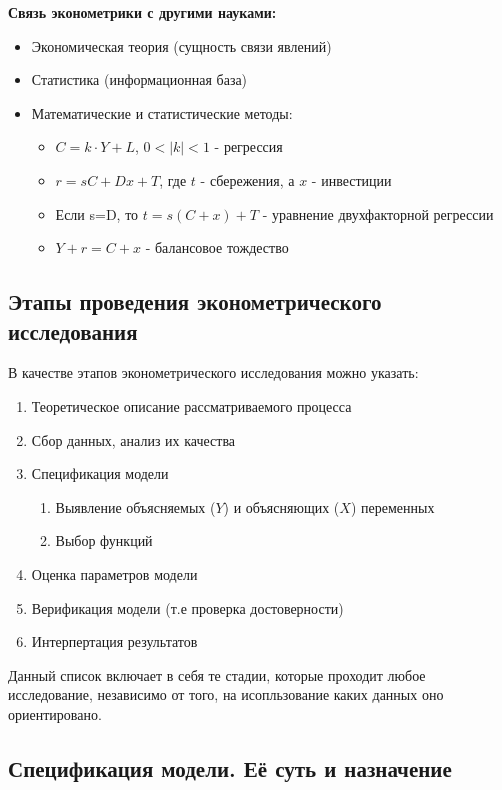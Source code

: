 \documentclass[aps,%
12pt,%
final,%
oneside,
onecolumn,%
musixtex, %
superscriptaddress,%
centertags]{article} %
\theoremstyle{plain}
\theoremstyle{definition}
\theoremstyle{remark}
\begin{document}
\textbf{Связь эконометрики с другими науками:}

\begin{itemize} 
  \item Экономическая теория (сущность связи явлений)
  \item Статистика (информационная база)
  \item Математические и статистические методы:
  \begin{itemize} 
  	\item $C=k\cdot Y+L$, $0<|k|<1$ - регрессия
  	\item $r=sC+Dx+T$, где $t$ - сбережения, а $x$ - инвестиции
  	\item Если s=D, то $t=s(C+x)+T$  - уравнение двухфакторной регрессии
  	\item $Y+r=C+x$ - балансовое тождество 
  \end{itemize} 
\end{itemize}
\newpage
\subsection{Этапы проведения эконометрического исследования }

В качестве этапов эконометрического исследования можно указать:
\begin{enumerate}
	\item Теоретическое описание рассматриваемого процесса
	\item Сбор данных, анализ их качества
	\item Спецификация модели
	\begin{enumerate}
		\item Выявление объясняемых ($Y$) и объясняющих ($X$) переменных 
		\item Выбор функций
	\end{enumerate}
	\item Оценка параметров модели
	\item Верификация модели (т.е проверка достоверности)
	\item Интерпертация результатов 
\end{enumerate}

Данный список включает в себя те стадии, которые проходит любое исследование, независимо от того, на исопльзование каких данных оно ориентировано.
\newpage
\subsection{Спецификация модели. Её суть и назначение}
\end{document}
